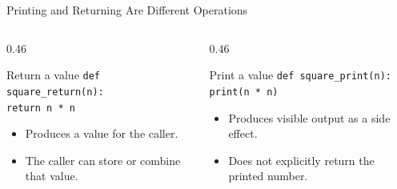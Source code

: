 \documentclass[aspectratio=169,10pt]{beamer}
\begin{document}
\begin{frame}{Printing and Returning Are Different Operations}
  \begin{columns}[T,onlytextwidth]
    \begin{column}{0.46\textwidth}
      \begin{block}{Return a value}
        \texttt{def square\_return(n):}\\
        \hspace*{0.18in}\texttt{return n * n}
      \end{block}
      \begin{itemize}
        \item Produces a value for the caller.
        \item The caller can store or combine that value.
      \end{itemize}
    \end{column}

    \begin{column}{0.46\textwidth}
      \begin{block}{Print a value}
        \texttt{def square\_print(n):}\\
        \hspace*{0.18in}\texttt{print(n * n)}
      \end{block}
      \begin{itemize}
        \item Produces visible output as a side effect.
        \item Does not explicitly return the printed number.
      \end{itemize}
    \end{column}
  \end{columns}
\end{frame}
\end{document}
